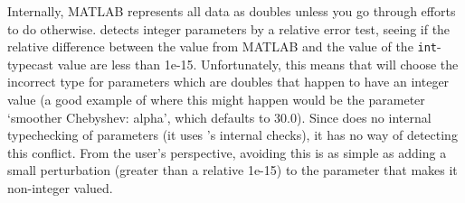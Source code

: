 Internally, MATLAB represents all data as doubles unless you go
through efforts to do otherwise.  \muemex detects integer parameters by
a relative error test, seeing if the relative difference between the
value from MATLAB and the value of the \texttt{int}-typecast value are
less than 1e-15.  Unfortunately, this means that \muemex will choose the
incorrect type for parameters which are doubles that happen to have an
integer value (a good example of where this might happen would be the parameter
`smoother Chebyshev: alpha', which defaults to 30.0).  Since \muemex does no
internal typechecking of
parameters (it uses \muelu's internal checks), it has no way of detecting
this conflict.  From the user's perspective, avoiding this is as
simple as adding a small perturbation (greater than a relative 1e-15)
to the parameter that makes it non-integer valued.



